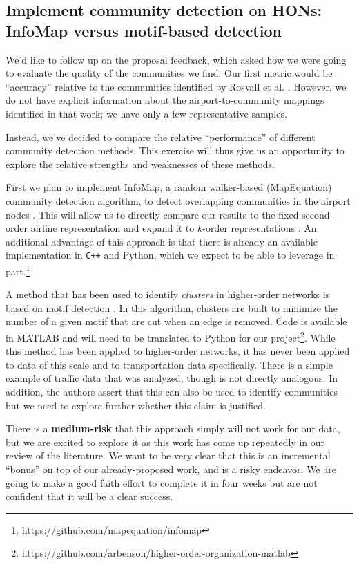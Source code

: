 \documentclass[sigconf]{acmart}
\begin{document}
\subsection{Implement community detection on HONs: InfoMap versus motif-based detection}
We'd like to follow up on the proposal feedback, which asked how we were going to evaluate the quality of the communities we find. Our first metric would be ``accuracy'' relative to the communities identified by Rosvall et al. \cite{Rosvall2014}. However, we do not have explicit information about the airport-to-community mappings identified in that work; we have only a few representative samples.

Instead, we've decided to compare the relative ``performance'' of different community detection methods. This exercise will thus give us an opportunity to explore the relative strengths and weaknesses of these methods.

First we plan to implement InfoMap, a random walker-based (MapEquation) community detection algorithm, to detect overlapping communities in the airport nodes \cite{Rosvall2009}. This will allow us to directly compare our results to the fixed second-order airline representation and expand it to $k$-order representations \cite{Rosvall2014}. An additional advantage of this approach is that there is already an available implementation in \texttt{C++} and Python, which we expect to be able to leverage in part.\footnote{https://github.com/mapequation/infomap}

A method that has been used to identify \textit{clusters} in higher-order networks is based on motif detection \cite{Benson2016}. In this algorithm, clusters are built to minimize the number of a given motif that are cut when an edge is removed. Code is available in MATLAB and will need to be translated to Python for our project\footnote{https://github.com/arbenson/higher-order-organization-matlab}. While this method has been applied to higher-order networks, it has never been applied to data of this scale and to transportation data specifically. There is a simple example of traffic data that was analyzed, though is not directly analogous. In addition, the authors assert that this can also be used to identify communities -- but we need to explore further whether this claim is justified.

There is a \textbf{medium-risk} that this approach simply will not work for our data, but we are excited to explore it as this work has come up repeatedly in our review of the literature. We want to be very clear that this is an incremental ``bonus'' on top of our already-proposed work, and is a risky endeavor. We are going to make a good faith effort to complete it in four weeks but are not confident that it will be a clear success.
\end{document}
